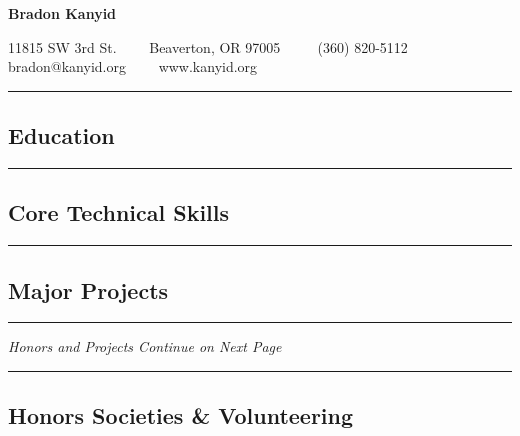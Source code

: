 




\begin{center}
{\LARGE \textbf{Bradon Kanyid}}

11815 SW 3rd St.\ \ \textbullet
\ \ Beaverton, OR 97005 \ \ \textbullet
\ \ (360) 820-5112\\
bradon@kanyid.org\ \ \textbullet
\ \ www.kanyid.org
\end{center}


\hrule
\vspace{-0.4em}
\subsection*{Education}

\vspace{1em}

\hrule
\vspace{-0.4em}
\subsection*{Core Technical Skills}

\vspace{1em}

\hrule
\vspace{-0.4em}
\subsection*{Major Projects}
\begin{itemize}
  
  
  
  
  
\end{itemize}

\hrule
\begin{center}
{\emph{Honors and Projects Continue on Next Page}}

\end{center}

\newpage

\hrule
\vspace{-0.4em}
\subsection*{Honors Societies \& Volunteering}
\begin{itemize}
  
  
  
\end{itemize}

